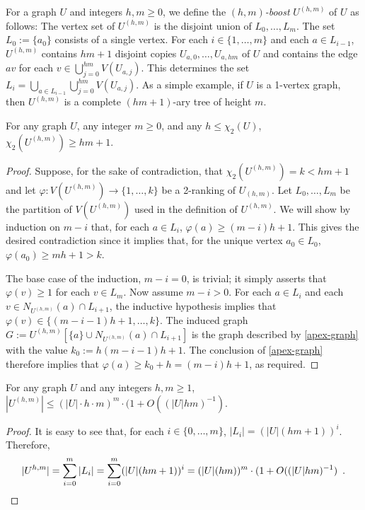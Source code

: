\documentclass[kpfonts]{patmorin}
\newcommand{\trn}{\chi_2}
\theoremstyle{named}
\begin{document}
For a graph $U$ and integers $h,m\ge 0$, we define the \emph{$(h,m)$-boost} $U^{(h,m)}$ of $U$ as follows: The vertex set of $U^{(h,m)}$ is the disjoint union of $L_0,\ldots,L_m$.  The set $L_0:=\{a_0\}$ consists of a single vertex. For each $i\in\{1,\ldots,m\}$ and each $a\in L_{i-1}$, $U^{(h,m)}$ contains $hm+1$ disjoint copies $U_{a,0},\ldots,U_{a,hm}$ of $U$ and contains the edge $av$ for each $v\in\bigcup_{j=0}^{hm} V(U_{a,j})$.  This determines the set $L_i=\bigcup_{a\in L_{i-1}}\bigcup_{j=0}^{hm} V(U_{a,j})$.  As a simple example, if $U$ is a 1-vertex graph, then $U^{(h,m)}$ is a complete $(hm+1)$-ary tree of height $m$.

\begin{lem}\label{boost}
    For any graph $U$, any integer $m\ge 0$, and any $h\le\trn(U)$, $\trn(U^{(h,m)})\ge hm +1$.
\end{lem}

\begin{proof}
    Suppose, for the sake of contradiction, that $\trn(U^{(h,m)})=k<hm+1$ and let $\varphi:V(U^{(h,m)})\to\{1,\ldots,k\}$ be a 2-ranking of $U_{(h,m)}$.  Let $L_0,\ldots,L_{m}$ be the partition of $V(U^{(h,m)})$ used in the definition of $U^{(h,m)}$. We will show by induction on $m-i$ that, for each $a\in L_{i}$, $\varphi(a)\ge(m-i)h+1$. This gives the desired contradiction since it implies that, for the unique vertex $a_0\in L_0$, $\varphi(a_0)\ge m h+1 > k$.

    The base case of the induction, $m-i=0$, is trivial; it simply asserts that $\varphi(v)\ge 1$ for each $v\in L_m$.  Now assume $m-i > 0$.  For each $a\in L_i$ and each  $v\in N_{U^{(h,m)}}(a)\cap L_{i+1}$, the inductive hypothesis implies that $\varphi(v)\in\{(m-i-1)h+1,\ldots,k\}$.  The induced graph $G:=U^{(h,m)}[\{a\}\cup N_{U^{(h,m)}}(a)\cap L_{i+1}]$ is the graph described by \cref{apex-graph} with the value $k_0:=h(m-i-1)h+1$.  The conclusion of \cref{apex-graph} therefore implies that $\varphi(a)\ge k_0+h=(m-i)h+1$, as required.
\end{proof}

\begin{lem}\label{boost-size}
    For any graph $U$ and any integers $h,m \ge 1$, $|U^{(h,m)}| \le (|U|\cdot h\cdot m)^{m}\cdot (1+O((|U|hm)^{-1})$.
\end{lem}

\begin{proof}
    It is easy to see that, for each $i\in \{0,\ldots,m\}$, $|L_i|=(|U|(hm+1))^i$.  Therefore,
    \[ |U^{h,m}| = \sum_{i=0}^m |L_i| = \sum_{i=0}^m (|U|(hm+1))^i = (|U|(hm))^{m}\cdot (1+O((|U|hm)^{-1}) \enspace . \qedhere
    \]
\end{proof}
\end{document}
